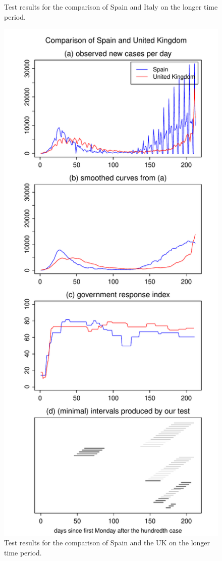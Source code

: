 \documentclass[a4paper,12pt]{article}
\numberwithin{equation}{section}
\begin{document}
\begin{figure}[p!]
\begin{minipage}[t]{0.49\textwidth}
\caption{Test results for the comparison of Spain and Italy on the longer time period.}
\end{minipage}
\hspace{0.25cm}
\begin{minipage}[t]{0.49\textwidth}
\includegraphics[width=\textwidth]{plots/ESP_vs_GBR_long}
\caption{Test results for the comparison of Spain and the UK on the longer time period.}
\end{minipage}
\end{figure}
\end{document}
